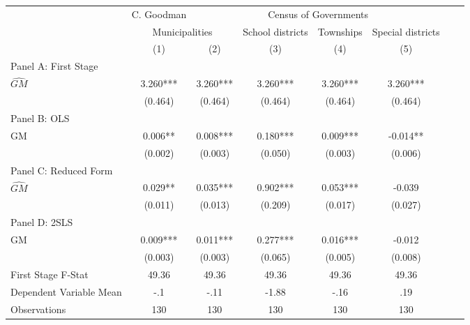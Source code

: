    \begin{tabular}{l*{7}{c}} \toprule
&\multicolumn{1}{c}{C. Goodman}&\multicolumn{4}{c}{Census of Governments}\\\cmidrule(lr){2-2}\cmidrule(lr){3-6}
&\multicolumn{2}{c}{Municipalities}&\multicolumn{1}{c}{School districts}&\multicolumn{1}{c}{Townships}&\multicolumn{1}{c}{Special districts}\\\cmidrule(lr){2-3}\cmidrule(lr){4-6}
&\multicolumn{1}{c}{(1)}&\multicolumn{1}{c}{(2)}&\multicolumn{1}{c}{(3)}&\multicolumn{1}{c}{(4)}&\multicolumn{1}{c}{(5)}\\
\cmidrule(lr){1-6}
\multicolumn{5}{l}{Panel A: First Stage}\\
\cmidrule(lr){1-6}
$\widehat{GM}$  &    3.260***&    3.260***&    3.260***&    3.260***&    3.260***\\
                &  (0.464)   &  (0.464)   &  (0.464)   &  (0.464)   &  (0.464)   \\
\cmidrule(lr){1-6}
\multicolumn{5}{l}{Panel B: OLS}\\
\cmidrule(lr){1-6}
GM              &    0.006** &    0.008***&    0.180***&    0.009***&   -0.014** \\
                &  (0.002)   &  (0.003)   &  (0.050)   &  (0.003)   &  (0.006)   \\
\cmidrule(lr){1-6}
\multicolumn{5}{l}{Panel C: Reduced Form}\\
\cmidrule(lr){1-6}
$\widehat{GM}$  &    0.029** &    0.035***&    0.902***&    0.053***&   -0.039   \\
                &  (0.011)   &  (0.013)   &  (0.209)   &  (0.017)   &  (0.027)   \\
\cmidrule(lr){1-6}
\multicolumn{5}{l}{Panel D: 2SLS}\\
\cmidrule(lr){1-6}
GM              &    0.009***&    0.011***&    0.277***&    0.016***&   -0.012   \\
                &  (0.003)   &  (0.003)   &  (0.065)   &  (0.005)   &  (0.008)   \\
\midrule
First Stage F-Stat&    49.36   &    49.36   &    49.36   &    49.36   &    49.36   \\
Dependent Variable Mean&      -.1   &     -.11   &    -1.88   &     -.16   &      .19   \\
Observations    &      130   &      130   &      130   &      130   &      130   \\
       \bottomrule \end{tabular}

